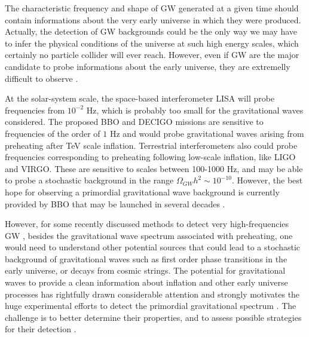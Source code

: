 \documentclass[11pt,a4paper,twoside]{book}
\begin{document}
 The characteristic frequency  and shape of GW generated at a given time should contain informations about the very early universe in which they were produced. Actually, the detection of GW backgrounds could be the only way we may have to infer the physical conditions of the universe at such high energy scales, which certainly no particle collider will ever reach. However, even if GW are the major candidate to probe informations about the early universe, they are extremelly difficult to observe \cite{Chap7:HybridModel}.
 
  At the solar-system scale, the space-based interferometer LISA will probe frequencies from $ 10^{-2} $ Hz, which is probably too small for the gravitational waves considered. The proposed BBO and DECIGO missions are sensitive to frequencies of the order of $ 1 $ Hz and would probe gravitational waves arising from preheating after TeV scale inflation. Terrestrial interferometers also could probe frequencies corresponding to preheating following low-scale inflation, like LIGO and VIRGO. These are sensitive to scales between 100-1000 Hz, and may be able to probe a stochastic background in the range $ \Omega_{GW}h^{2} \sim 10^{-10} $. However, the best hope for observing a primordial gravitational wave background is currently provided by BBO that may be launched in several decades \cite{Chap7:GreenMethod}.
  
 However, for some recently discussed methods to detect very high-frequencies GW \cite{Conclusion:GwChallengesAndOpportunitiesGW}, besides the gravitational wave spectrum associated with preheating, one would need to understand other potential sources that could lead to a stochastic background of gravitational waves such as first order phase transitions in the early universe, or decays from cosmic strings. The potential for gravitational waves to provide a clean information about inflation and other early universe processes has rightfully drawn considerable attention and strongly motivates the huge experimental efforts to detect the primordial gravitational spectrum \cite{GWFromInflation:Intro}. The challenge is to better determine their properties, and to assess possible strategies for their detection \cite{Conclusion:PropertiesGW}.
  
 

\backmatter
\end{document}

